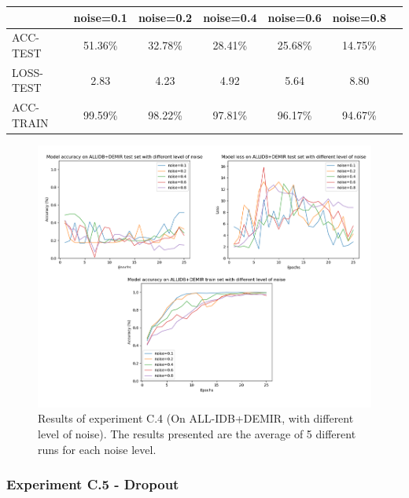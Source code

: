 \documentclass[11pt, openany]{report}
\theoremstyle{plain}
\theoremstyle{definition}
\theoremstyle{remark}
\begin{document}
\begin{center}
\begin{tabular}{|l|c|c|c|c|c|c|}
  \hline
   & \textbf{noise=0.1} & \textbf{noise=0.2} & \textbf{noise=0.4} & \textbf{noise=0.6} & \textbf{noise=0.8}\\
  \hline
  ACC-TEST & 51.36\% & 32.78\% & 28.41\% & 25.68\% & 14.75\%\\
  LOSS-TEST & 2.83 & 4.23 & 4.92 &  5.64 & 8.80 \\ 
  ACC-TRAIN & 99.59\% & 98.22\% & 97.81\% & 96.17\% & 94.67\% \\ 
  \hline
\end{tabular}
\label{table:results-C4}
\end{center}

\begin{figure}[H]
  \centering
  \includegraphics[scale=0.45]{Code/ch6-LeukemiaSubtypes/figures_result/LEUK-SUBTYPES/leukSub-noise.PNG}
  \caption{Results of experiment C.4 (On ALL-IDB+DEMIR, with different level of noise). The results presented are the average of 5 different runs for each noise level.}
  \label{fig:results-C4}
\end{figure}


\subsubsection{Experiment C.5 - Dropout}
\end{document}
